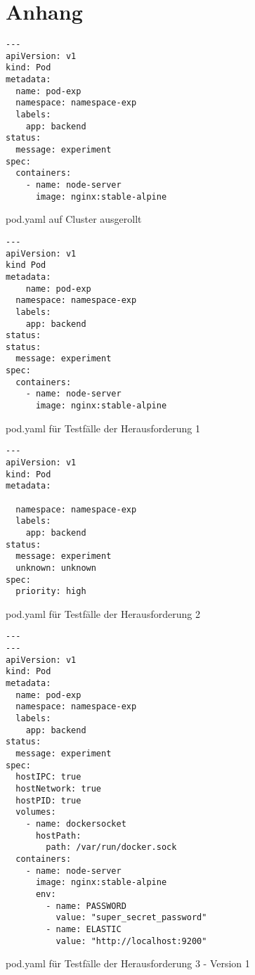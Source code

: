 \chapter{Anhang}\label{ch:appendix}

\begin{listing}[htp]
  \begin{verbatim}
---
apiVersion: v1
kind: Pod
metadata:
  name: pod-exp
  namespace: namespace-exp
  labels:
    app: backend  
status:
  message: experiment
spec: 
  containers:
    - name: node-server
      image: nginx:stable-alpine
    \end{verbatim}
  \caption{pod.yaml auf Cluster ausgerollt}
  \label{lst:pod-yaml-file}
\end{listing}

\begin{listing}[htp]
  \begin{verbatim}
---
apiVersion: v1
kind Pod
metadata:
    name: pod-exp
  namespace: namespace-exp
  labels:
    app: backend
status:    
status:
  message: experiment
spec:
  containers:
    - name: node-server
      image: nginx:stable-alpine
    \end{verbatim}
  \caption{pod.yaml für Testfälle der Herausforderung 1}
  \label{lst:pod-yaml-file}
\end{listing}

\begin{listing}[htp]
  \begin{verbatim}
---
apiVersion: v1
kind: Pod
metadata:
  
  namespace: namespace-exp
  labels:
    app: backend
status:    
  message: experiment
  unknown: unknown  
spec:
  priority: high
    \end{verbatim}
  \caption{pod.yaml für Testfälle der Herausforderung 2}
  \label{lst:pod-yaml-file}
\end{listing}

\begin{listing}[htp]
  \begin{verbatim}
---
---
apiVersion: v1
kind: Pod
metadata:
  name: pod-exp
  namespace: namespace-exp
  labels:
    app: backend
status:    
  message: experiment 
spec:
  hostIPC: true
  hostNetwork: true
  hostPID: true
  volumes:
    - name: dockersocket
      hostPath:
        path: /var/run/docker.sock
  containers:
    - name: node-server
      image: nginx:stable-alpine
      env:
        - name: PASSWORD
          value: "super_secret_password"
        - name: ELASTIC
          value: "http://localhost:9200"
  \end{verbatim}
  \caption{pod.yaml für Testfälle der Herausforderung 3 - Version 1}
  \label{lst:pod-yaml-file}
\end{listing}

